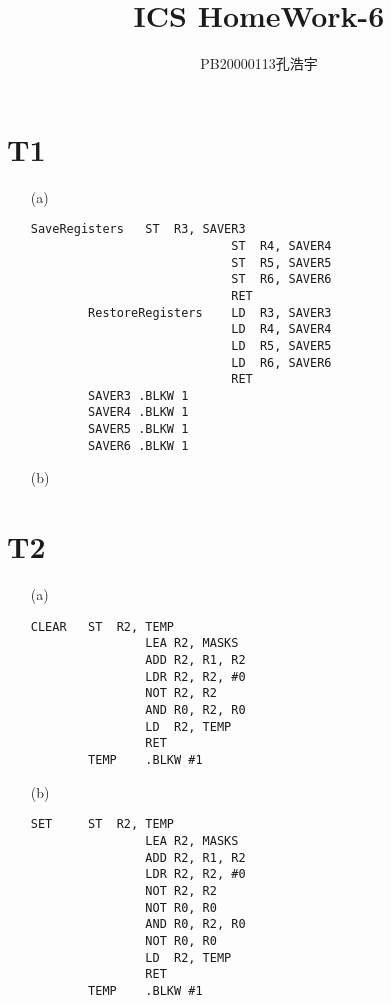 \documentclass{article}
\title{ICS  HomeWork-6}
\author{PB20000113孔浩宇}
\begin{document}
\maketitle
\section*{T1}
\begin{enumerate}
    \item [(a)]
    \begin{lstlisting}[basicstyle=\ttfamily,language={[x86masm]Assembler}]
            SaveRegisters   ST  R3, SAVER3 
                            ST  R4, SAVER4
                            ST  R5, SAVER5 
                            ST  R6, SAVER6
                            RET 
        RestoreRegisters    LD  R3, SAVER3 
                            LD  R4, SAVER4
                            LD  R5, SAVER5 
                            LD  R6, SAVER6 
                            RET
        SAVER3 .BLKW 1
        SAVER4 .BLKW 1
        SAVER5 .BLKW 1
        SAVER6 .BLKW 1
    \end{lstlisting}
    \item [(b)]
\end{enumerate}

\section*{T2}
\begin{enumerate}
    \item [(a)]
    \begin{lstlisting}[basicstyle=\ttfamily,language={[x86masm]Assembler}]
        CLEAR   ST  R2, TEMP
                LEA R2, MASKS
                ADD R2, R1, R2
                LDR R2, R2, #0
                NOT R2, R2
                AND R0, R2, R0
                LD  R2, TEMP
                RET
        TEMP    .BLKW #1
    \end{lstlisting}

    \item [(b)]
    \begin{lstlisting}[basicstyle=\ttfamily,language={[x86masm]Assembler}]
        SET     ST  R2, TEMP
                LEA R2, MASKS
                ADD R2, R1, R2
                LDR R2, R2, #0
                NOT R2, R2
                NOT R0, R0
                AND R0, R2, R0
                NOT R0, R0
                LD  R2, TEMP
                RET
	    TEMP    .BLKW #1
    \end{lstlisting}
\end{enumerate}
\end{document}
